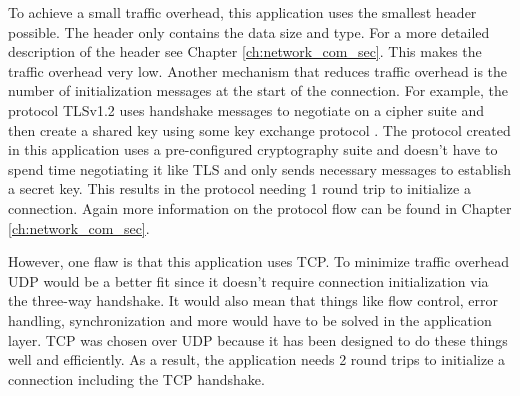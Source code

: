 To achieve a small traffic overhead, this application uses the smallest header possible. The header only contains the data size and type. For a more detailed description of the header see Chapter \ref{ch:network_com_sec}. This makes the traffic overhead very low. Another mechanism that reduces traffic overhead is the number of initialization messages at the start of the connection. For example, the protocol TLSv1.2 uses handshake messages to negotiate on a cipher suite and then create a shared key using some key exchange protocol \cite{Ristic2014}. The protocol created in this application uses a pre-configured cryptography suite and doesn't have to spend time negotiating it like TLS and only sends necessary messages to establish a secret key. This results in the protocol needing 1 round trip to initialize a connection. Again more information on the protocol flow can be found in Chapter \ref{ch:network_com_sec}.

However, one flaw is that this application uses TCP. To minimize traffic overhead UDP would be a better fit since it doesn't require connection initialization via the three-way handshake. It would also mean that things like flow control, error handling, synchronization and more would have to be solved in the application layer. TCP was chosen over UDP because it has been designed to do these things well and efficiently. As a result, the application needs 2 round trips to initialize a connection including the TCP handshake.
